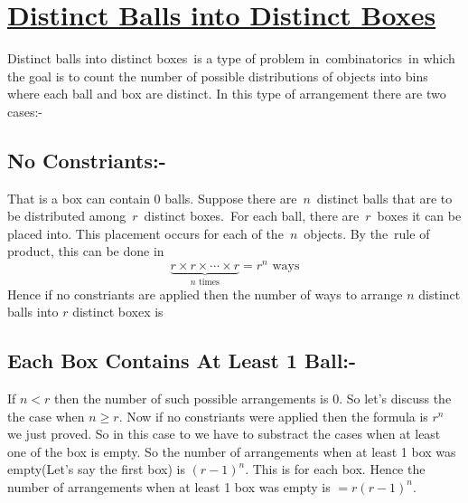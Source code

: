 \documentclass[12pt]{article}
\begin{document}
\pagebreak


\section{\underline{Distinct Balls into Distinct Boxes}}

Distinct balls into distinct boxes is a type of problem in combinatorics in which the goal is to count the number of possible distributions of objects into bins where each ball and box are distinct. In this type of arrangement there are two cases:-
\subsection{No Constriants:-}
That is a box can contain 0 balls. Suppose there are $n $ distinct balls that are to be distributed among $r $ distinct boxes. For each ball, there are $r $ boxes it can be placed into. This placement occurs for each of the $n$ objects. By the rule of product, this can be done in $$\underbrace{r\times r\times\cdots\times r}_{n\text{ times}} =r^n \text{ ways}$$ Hence if no constriants are applied then the number of ways to arrange $n $ distinct balls into $r$ distinct boxex is 
\subsection{Each Box Contains At Least 1 Ball:-}
If $n <r$ then the number of such possible arrangements is 0. So let's discuss the the case when $n\geq r $. Now if no constriants were applied then the formula is $r^n $ we just proved. So in this case to we have to substract the cases when at least one of the box is empty. So the number of arrangements when at least 1 box was empty(Let's say the first box) is $(r-1)^n $. This is for each box. Hence the number of arrangements when at least 1 box was empty is $=r (r-1)^n $. 
\end{document}

